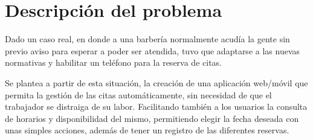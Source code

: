 \chapter{Descripción del problema}

Dado un caso real, en donde a una barbería normalmente acudía la gente sin previo aviso para esperar a
poder ser atendida, tuvo que adaptarse a las nuevas normativas y habilitar un teléfono para la reserva de citas.

Se plantea a partir de esta situación, la creación de una aplicación web/móvil que permita la gestión de las citas
automáticamente, sin necesidad de que el trabajador se distraiga de su labor. Facilitando también a los usuarios la
consulta de horarios y disponibilidad del mismo, permitiendo elegir la fecha deseada con unas simples acciones,
además de tener un registro de las diferentes reservas.


